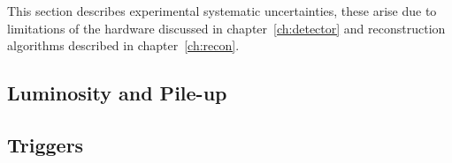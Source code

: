 This section describes experimental systematic uncertainties, these arise due to
limitations of the hardware discussed in chapter~\ref{ch:detector} and
reconstruction algorithms described in chapter~\ref{ch:recon}.

\subsection{Luminosity and Pile-up}
\label{sec:lumisys}



\subsection{Triggers}
\label{sec:trigsys}



